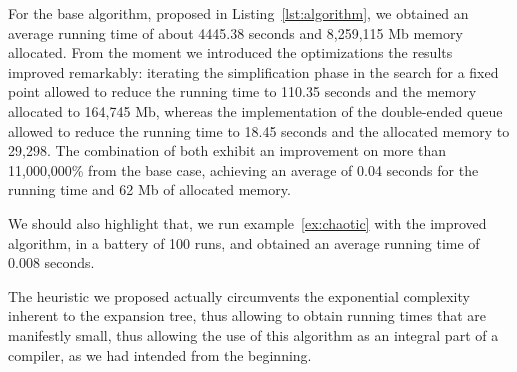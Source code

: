 For the base algorithm, proposed in Listing~\ref{lst:algorithm}, we
obtained an average running time of about 4445.38 seconds and
8,259,115 Mb memory allocated. From the moment we introduced the
optimizations the results improved remarkably: iterating the
simplification phase in the search for a fixed point allowed to reduce
the running time to 110.35 seconds and the memory allocated to 164,745
Mb, whereas the implementation of the double-ended queue allowed to
reduce the running time to 18.45 seconds and the allocated memory to
29,298. The combination of both exhibit an improvement on more than
11,000,000\% from the base case, achieving an average of 0.04
seconds for the running time and 62 Mb of allocated memory.

We should also highlight that, we run example~\eqref{ex:chaotic}
with the improved algorithm, in a battery of 100 runs, and obtained an
average running time of 0.008 seconds.

The heuristic we proposed actually circumvents the exponential complexity 
inherent to the expansion tree, thus allowing to obtain running times that 
are manifestly small, thus allowing the use of this algorithm as an integral 
part of a compiler, as we had intended from the beginning.

